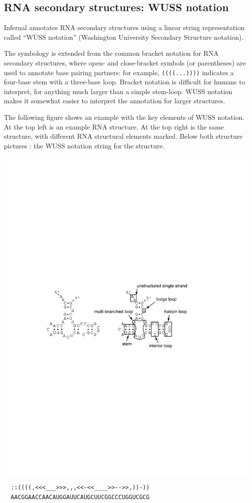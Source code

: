 \subsection{RNA secondary structures: WUSS notation}

Infernal annotates RNA secondary structures using a linear
string representation called ``WUSS notation'' (Washington University
Secondary Structure notation).

The symbology is extended from the common bracket notation for RNA
secondary structures, where open- and close-bracket symbols (or
parentheses) are used to annotate base pairing partners: for example,
\verb+((((...))))+ indicates a four-base stem with a three-base loop.
Bracket notation is difficult for humans to interpret, for anything
much larger than a simple stem-loop. WUSS notation makes it somewhat
easier to interpret the annotation for larger structures.

The following figure shows an example with the key elements of WUSS
notation.  At the top left is an example RNA structure. At the top
right is the same structure, with different RNA structural elements
marked. Below both structure pictures : the WUSS notation string for
the structure.

\begin{center}
\includegraphics[scale=0.8]{Figures/rna_elements}
\end{center}
\begin{center}
\begin{BVerbatim}
  ::((((,<<<___>>>,,,<<-<<____>>-->>,))-))
  AACGGAACCAACAUGGAUUCAUGCUUCGGCCCUGGUCGCG
\end{BVerbatim}
\end{center}

